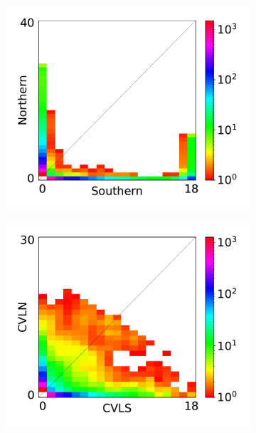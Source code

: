 \begin{figure}[ht]
    \centering
    \begin{subfigure}[b]{.33\textwidth}
    \includegraphics[width=\textwidth]{images_experiments/gaboon_forest_frog/dadi_2pops_Northern_Southern_snps.pdf}
    \label{fig:part2:experiments:frog:data_1}
    \end{subfigure}%
    \begin{subfigure}[b]{.33\textwidth}
    \includegraphics[width=\textwidth]{images_experiments/gaboon_forest_frog/dadi_2pops_CVLN_CVLS_snps.pdf}

\end{subfigure}
\end{figure}
